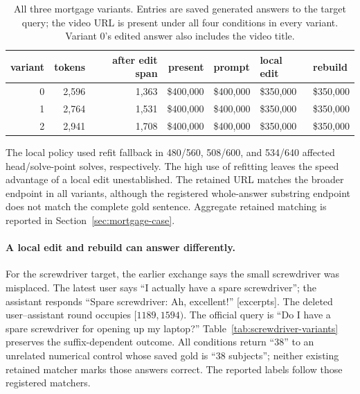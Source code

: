 \begin{table}[ht]
\centering\small
\caption{All three mortgage variants. Entries are saved generated answers to
the target query; the video URL is present under all four conditions in every
variant. Variant 0's edited answer also includes the video title.}
\label{tab:mortgage-variants}
\begin{tabular}{@{}rrrrlll@{}}
\toprule
variant & tokens & after edit span & present & prompt & local edit & rebuild\\
\midrule
0 & 2,596 & 1,363 & \$400,000 & \$400,000 & \$350,000 & \$350,000\\
1 & 2,764 & 1,531 & \$400,000 & \$400,000 & \$350,000 & \$350,000\\
2 & 2,941 & 1,708 & \$400,000 & \$400,000 & \$350,000 & \$350,000\\
\bottomrule
\end{tabular}
\end{table}
The local policy used refit fallback in 480/560, 508/600, and 534/640 affected
head/solve-point solves, respectively. The high use of refitting leaves the speed advantage of a
local edit unestablished. The retained URL matches the broader endpoint in
all variants, although the registered whole-answer substring endpoint does
not match the complete gold sentence. Aggregate retained matching is
reported in Section~\ref{sec:mortgage-case}.

\paragraph{A local edit and rebuild can answer differently.}
For the screwdriver target, the earlier exchange says the small screwdriver
was misplaced. The latest user says ``I actually have a spare screwdriver'';
the assistant responds ``Spare screwdriver: Ah, excellent!'' [excerpts].
The deleted user--assistant round occupies $[1189,1594)$. The official query
is ``Do I have a spare screwdriver for opening up my laptop?''
Table~\ref{tab:screwdriver-variants} preserves the suffix-dependent outcome.
All conditions return ``38'' to an unrelated numerical control whose saved
gold is ``38 subjects''; neither existing retained matcher marks those answers
correct. The reported labels follow those registered matchers.

